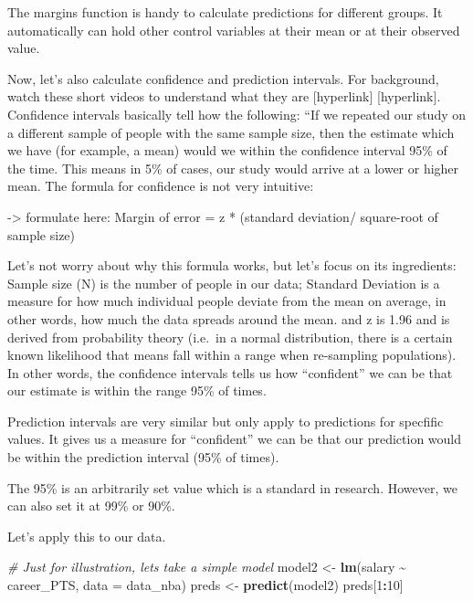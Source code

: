 \documentclass[
]{book}
\newenvironment{Shaded}{\begin{snugshade}}{\end{snugshade}}
\newcommand{\AttributeTok}[1]{\textcolor[rgb]{0.13,0.29,0.53}{#1}}
\newcommand{\CommentTok}[1]{\textcolor[rgb]{0.56,0.35,0.01}{\textit{#1}}}
\newcommand{\DecValTok}[1]{\textcolor[rgb]{0.00,0.00,0.81}{#1}}
\newcommand{\FunctionTok}[1]{\textcolor[rgb]{0.13,0.29,0.53}{\textbf{#1}}}
\newcommand{\NormalTok}[1]{#1}
\newcommand{\OtherTok}[1]{\textcolor[rgb]{0.56,0.35,0.01}{#1}}
\newcommand{\SpecialCharTok}[1]{\textcolor[rgb]{0.81,0.36,0.00}{\textbf{#1}}}
\begin{document}
The margins function is handy to calculate predictions for different groups.
It automatically can hold other control variables at their mean or at their observed value.

Now, let's also calculate confidence and prediction intervals. For background, watch these short videos to understand what they are {[}hyperlink{]} {[}hyperlink{]}. Confidence intervals basically tell how the following: ``If we repeated our study on a different sample of people with the same sample size, then the estimate which we have (for example, a mean) would we within the confidence interval 95\% of the time. This means in 5\% of cases, our study would arrive at a lower or higher mean. The formula for confidence is not very intuitive:

-\textgreater{} formulate here: Margin of error = z * (standard deviation/ square-root of sample size)

Let's not worry about why this formula works, but let's focus on its ingredients: Sample size (N) is the number of people in our data; Standard Deviation is a measure for how much individual people deviate from the mean on average, in other words, how much the data spreads around the mean. and z is 1.96 and is derived from probability theory (i.e.~in a normal distribution, there is a certain known likelihood that means fall within a range when re-sampling populations). In other words, the confidence intervals tells us how ``confident'' we can be that our estimate is within the range 95\% of times.

Prediction intervals are very similar but only apply to predictions for specfific values. It gives us a measure for ``confident'' we can be that our prediction would be within the prediction interval (95\% of times).

The 95\% is an arbitrarily set value which is a standard in research. However, we can also set it at 99\% or 90\%.

Let's apply this to our data.

\begin{Shaded}
\begin{Highlighting}[]
\CommentTok{\# Just for illustration, let\textquotesingle{}s take a simple model}
\NormalTok{model2 }\OtherTok{\textless{}{-}} \FunctionTok{lm}\NormalTok{(salary }\SpecialCharTok{\textasciitilde{}}\NormalTok{ career\_PTS, }\AttributeTok{data =}\NormalTok{ data\_nba)}
\NormalTok{preds }\OtherTok{\textless{}{-}} \FunctionTok{predict}\NormalTok{(model2)}
\NormalTok{preds[}\DecValTok{1}\SpecialCharTok{:}\DecValTok{10}\NormalTok{]}
\end{Highlighting}
\end{Shaded}
\end{document}
